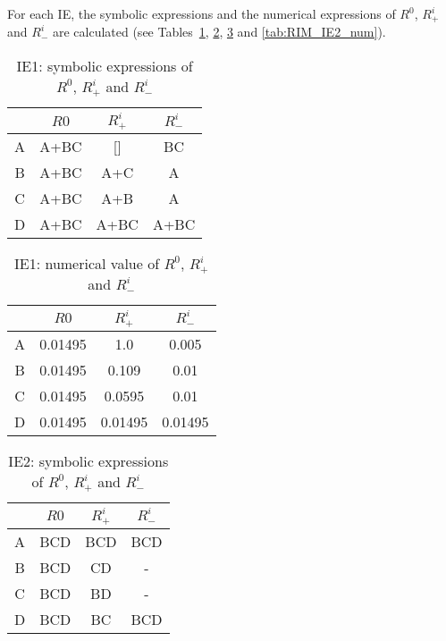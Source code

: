 For each IE, the symbolic expressions and the numerical expressions of $R^0$, $R^i_+$ and $R^i_-$ are calculated
(see Tables~\ref{tab:RIM_IE1_symb}, \ref{tab:RIM_IE1_num}, \ref{tab:RIM_IE2_symb} and \ref{tab:RIM_IE2_num}).

\begin{table}[h!]
  \centering
  \caption{IE1: symbolic expressions of $R^0$, $R^i_+$ and $R^i_-$}
  \label{tab:RIM_IE1_symb}
  \begin{tabular}{c|ccc}
    \toprule
    & $R0$ & $R^i_+$ & $R^i_-$ \\
    \midrule
    A & A+BC & []   & BC   \\
    B & A+BC & A+C  & A    \\
    C & A+BC & A+B  & A    \\
    D & A+BC & A+BC & A+BC \\
    \bottomrule
  \end{tabular}
\end{table}

\begin{table}[h!]
  \centering
  \caption{IE1: numerical value of $R^0$, $R^i_+$ and $R^i_-$}
  \label{tab:RIM_IE1_num}
  \begin{tabular}{c|ccc}
    \toprule
    & $R0$ & $R^i_+$ & $R^i_-$ \\
    \midrule
    A & 0.01495 & 1.0     & 0.005   \\
    B & 0.01495 & 0.109   & 0.01    \\
    C & 0.01495 & 0.0595  & 0.01    \\
    D & 0.01495 & 0.01495 & 0.01495 \\
    \bottomrule
  \end{tabular}
\end{table}

\begin{table}[h!]
  \centering
  \caption{IE2: symbolic expressions of $R^0$, $R^i_+$ and $R^i_-$}
  \label{tab:RIM_IE2_symb}
  \begin{tabular}{c|ccc}
    \toprule
    & $R0$ & $R^i_+$ & $R^i_-$ \\
    \midrule
    A & BCD & BCD & BCD  \\
    B & BCD & CD  & -    \\
    C & BCD & BD  & -    \\
    D & BCD & BC  & BCD  \\
    \bottomrule
  \end{tabular}
\end{table}

